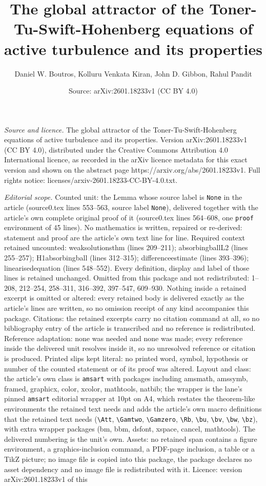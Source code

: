 \documentclass[10pt,a4paper]{amsart}
\title[The global attractor of the Toner-Tu-Swift-Hohenberg equatio]{The global attractor of the Toner-Tu-Swift-Hohenberg equations of active turbulence and its properties}
\author{Daniel W. Boutros, Kolluru Venkata Kiran, John D. Gibbon, Rahul Pandit}
\date{Source: arXiv:2601.18233v1 (CC BY 4.0)}
\begin{document}
\maketitle

\noindent\emph{Source and licence.} The global attractor of the Toner-Tu-Swift-Hohenberg equations of active turbulence and its properties. Version arXiv:2601.18233v1 (CC BY 4.0), distributed under the Creative Commons Attribution 4.0 International licence, as recorded in the arXiv licence metadata for this exact version and shown on the abstract page https://arxiv.org/abs/2601.18233v1. Full rights notice: licenses/arxiv-2601.18233-CC-BY-4.0.txt.\par\smallskip

\noindent\textit{Editorial scope.} Counted unit: the Lemma whose source label is \texttt{None} in the article (source0.tex lines 553--563, source label \texttt{None}), delivered together with the article's own complete original proof of it (source0.tex lines 564--608, one \texttt{proof} environment of 45 lines). No mathematics is written, repaired or re-derived: statement and proof are the article's own text line for line. Required context retained uncounted: weaksolutionsthm (lines 209--211); absorbingballL2 (lines 255--257); H1absorbingball (lines 312--315); differenceestimate (lines 393--396); linearisedequation (lines 548--552). Every definition, display and label of those lines is retained unchanged. Omitted from this package and not redistributed: 1--208, 212--254, 258--311, 316--392, 397--547, 609--930. Nothing inside a retained excerpt is omitted or altered: every retained body is delivered exactly as the article's lines are written, so no omission receipt of any kind accompanies this package. Citations: the retained excerpts carry no citation command at all, so no bibliography entry of the article is transcribed and no reference is redistributed. Reference adaptation: none was needed and none was made; every reference inside the delivered unit resolves inside it, so no unresolved reference or citation is produced. Printed slips kept literal: no printed word, symbol, hypothesis or number of the counted statement or of its proof was altered. Layout and class: the article's own class is \texttt{amsart} with packages including amsmath, amssymb, framed, graphicx, color, xcolor, mathtools, natbib; the wrapper is the lane's pinned \texttt{amsart} editorial wrapper at 10pt on A4, which restates the theorem-like environments the retained text needs and adds the article's own macro definitions that the retained text needs (\texttt{\textbackslash Att}, \texttt{\textbackslash Gamtwo}, \texttt{\textbackslash Gamzero}, \texttt{\textbackslash Rb}, \texttt{\textbackslash bu}, \texttt{\textbackslash bv}, \texttt{\textbackslash bw}, \texttt{\textbackslash bz}), with extra wrapper packages (bm, bbm, dsfont, xspace, cancel, mathtools). The delivered numbering is the unit's own. Assets: no retained span contains a figure environment, a graphics-inclusion command, a PDF-page inclusion, a table or a TikZ picture; no image file is copied into this package, the package declares no asset dependency and no image file is redistributed with it. Licence: version arXiv:2601.18233v1 of this 
\end{document}
